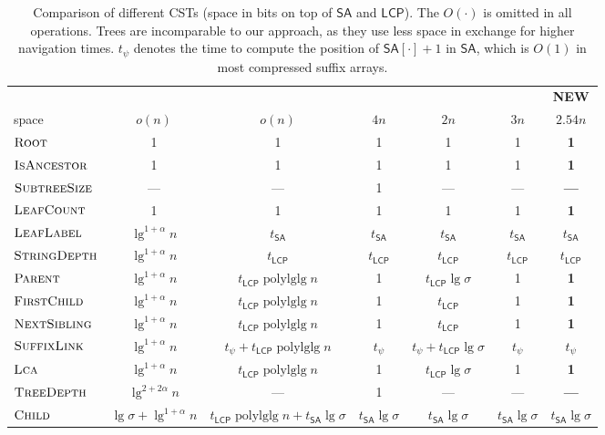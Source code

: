 \documentclass[11pt,onecolumn,final]{article} \usepackage{a4}
\newcommand{\LCP}[0]{\mathsf{LCP}}
\newcommand{\SUF}[0]{\mathsf{SA}}
\newcommand{\lca}{\ensuremath{\textsc{Lca}}}
\newcommand{\sroot}{\ensuremath{\textsc{Root}}}
\newcommand{\ssize}{\ensuremath{\textsc{SubtreeSize}}}
\newcommand{\locate}{\ensuremath{\textsc{LeafLabel}}}
\newcommand{\parent}{\ensuremath{\textsc{Parent}}}
\newcommand{\ancestor}{\ensuremath{\textsc{IsAncestor}}}
\newcommand{\sdepth}{\ensuremath{\textsc{StringDepth}}}
\newcommand{\tdepth}{\ensuremath{\textsc{TreeDepth}}}
\newcommand{\scount}{\ensuremath{\textsc{LeafCount}}}
\newcommand{\fchild}{\ensuremath{\textsc{FirstChild}}}
\newcommand{\nsibling}{\ensuremath{\textsc{NextSibling}}}
\newcommand{\child}{\ensuremath{\textsc{Child}}}
\newcommand{\slink}{\ensuremath{\textsc{SuffixLink}}}
\theoremstyle{plain}
\theoremstyle{remark}
\DeclareMathOperator*{\polyloglog}{polylglg}
\begin{document}
\begin{table}[t]
  \small
  \centering
  \caption{Comparison of different CSTs (space in bits on top of $\SUF$ and $\LCP$). The $O(\cdot)$ is omitted in all operations. Trees \cite{russo08fully,fischer09faster,ohlebusch09compressed} are incomparable to our approach, as they use less space in exchange for higher navigation times. $t_\psi$ denotes the time to compute the position of $\SUF[\cdot]+1$ in $\SUF$, which is $O(1)$ in most compressed suffix arrays.}
  \label{tbl:cst}
  \begin{tabular}{|l||c|c||c|c|c|c|}
    \hline
    & \textbf{\cite{russo08fully}} & \textbf{\cite{fischer09faster,canovas10practical}}& \textbf{\cite{munro01space,grossi05compressed,sadakane07compressed}} & \textbf{\cite{ohlebusch09compressed}} & \textbf{\cite{ohlebusch10cst++}} & \textbf{NEW}\\
    \hfill space & $o(n)$ & $o(n)$ & $4n$ & $2n$ & $3n$ & \boldmath$2.54n$ \\ \hline\hline
    \sroot & 1 & 1 & 1 & 1 & 1 & \textbf{1}\\\hline
    \ancestor & 1 & 1 & 1 & 1 & 1 & \textbf{1}\\\hline
    \ssize & --- & --- & 1 & --- & --- & \textbf{---}\\\hline
    \scount & 1 & 1 & 1 & 1 & 1 & \textbf{1}\\\hline
    \locate & $\lg^{1+\alpha}n$ & $t_\SUF$ & $t_\SUF$ & $t_\SUF$ & $t_\SUF$ & \boldmath$t_\SUF$\\\hline
    \sdepth & $\lg^{1+\alpha} n$ & $t_\LCP$ & $t_\LCP$ & $t_\LCP$ & $t_\LCP$ & \boldmath$t_\LCP$ \\\hline
    \parent & $\lg^{1+\alpha} n$ & $t_\LCP\polyloglog n$ & 1 & $t_\LCP\lg\sigma$ & 1 & \textbf{1} \\\hline
    \fchild & $\lg^{1+\alpha} n$ & $t_\LCP\polyloglog n$ & 1 & $t_\LCP$ & 1 & \textbf{1} \\\hline
    \nsibling& $\lg^{1+\alpha} n$ & $t_\LCP\polyloglog n$ & 1 & $t_\LCP$ & 1 & \textbf{1} \\\hline
    \slink& $\lg^{1+\alpha} n$ & $t_\psi + t_\LCP\polyloglog n$ & $t_\psi$ & $t_\psi + t_\LCP\lg\sigma$ & $t_\psi$ & \boldmath$t_\psi$\\\hline
    \lca & $\lg^{1+\alpha} n$ & $t_\LCP\polyloglog n$ & 1 & $t_\LCP\lg\sigma$ & 1 & \textbf{1}\\\hline
    \tdepth & $\lg^{2+2\alpha} n$ & --- & 1 & --- & --- & \textbf{---} \\\hline
    \child & $\lg\sigma+\lg^{1+\alpha} n$ & \scriptsize $t_\LCP\polyloglog n + t_\SUF \lg\sigma$ & $t_\SUF \lg\sigma$ & $t_\SUF \lg\sigma$ & $t_\SUF \lg\sigma$ & \boldmath$t_\SUF \lg\sigma$\\\hline
  \end{tabular}
\end{table}
\end{document}
